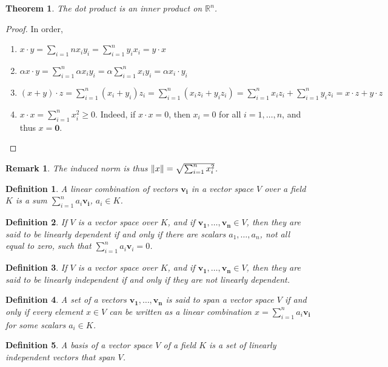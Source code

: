 \documentclass[crop=false,class=book]{standalone}
\theoremstyle{mystyle}
\newtheorem{theorem}{Theorem}[section]
\newtheorem{definition}{Definition}[section]
\newtheorem{remark}{Remark}[section]
\DeclarePairedDelimiter\norm{\lVert}{\rVert}
\begin{document}
\begin{theorem}
The dot product is an inner product on $\mathbb{R}^n$.
\end{theorem}
\begin{proof}
In order,
\begin{enumerate}
\item $x\cdot y = \sum_{i=1}{n} x_i y_i = \sum_{i=1}^{n} y_i x_i = y\cdot x$
\item $\alpha x\cdot y = \sum_{i=1}^{n} \alpha x_i y_i = \alpha \sum_{i=1}^{n} x_i y_i = \alpha x_i \cdot y_i$
\item $(x+y)\cdot z = \sum_{i=1}^{n} (x_i+y_i)z_i = \sum_{i=1}^{n} (x_iz_i +y_i z_i)=\sum_{i=1}^{n}x_i z_i+\sum_{i=1}^{n} y_i z_i = x\cdot z + y\cdot z$
\item $x\cdot x = \sum_{i=1}^{n} x_i^2 \geq 0$. Indeed, if $x\cdot x = 0$, then $x_i = 0$ for all $i=1,\hdots, n$, and thus $x=\mathbf{0}$.
\end{enumerate}
\end{proof}
\begin{remark}
The induced norm is thus $\norm{x} = \sqrt{\sum_{i=1}^{n} x_i^2}$.
\end{remark}
\begin{definition}
A linear combination of vectors $\mathbf{v_i}$ in a vector space $V$ over a field $K$ is a sum $\sum_{i=1}^{n} a_i \mathbf{v_i}$, $a_i \in K$.
\end{definition}
\begin{definition}
If $V$ is a vector space over $K$, and if $\mathbf{v_1},\hdots, \mathbf{v_n}\in V$, then they are said to be linearly dependent if and only if there are scalars $a_1,\hdots, a_n$, not all equal to zero, such that $\sum_{i=1}^{n} a_i \mathbf{v}_i = 0$.
\end{definition}
\begin{definition}
If $V$ is a vector space over $K$, and if $\mathbf{v_1},\hdots, \mathbf{v_n}\in V$, then they are said to be linearly independent if and only if they are not linearly dependent.
\end{definition}
\begin{definition}
A set of a vectors $\mathbf{v_1},\hdots, \mathbf{v_n}$ is said to span a vector space $V$ if and only if every element $x\in V$ can be written as a linear combination $x=\sum_{i=1}^{n} a_i \mathbf{v_i}$ for some scalars $a_i \in K$.
\end{definition}
\begin{definition}
A basis of a vector space $V$ of a field $K$ is a set of linearly independent vectors that span $V$.
\end{definition}
\end{document}
